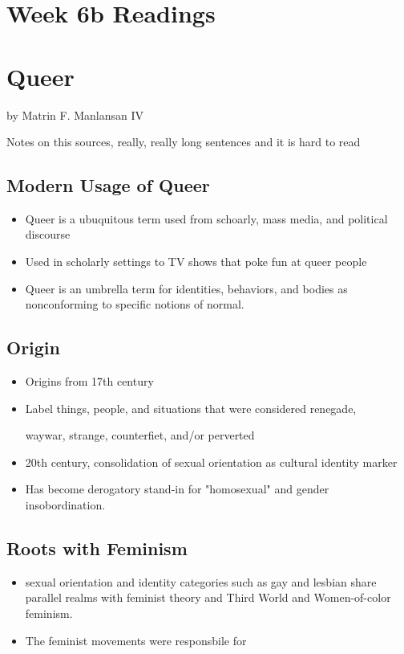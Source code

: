 \documentclass{article}
\begin{document}
  \section*{Week 6b Readings}

  \section{Queer}
  by Matrin F. Manlansan IV

  Notes on this sources, really, really long sentences and
  it is hard to read

  \subsection{Modern Usage of Queer}
  \begin{itemize}
    \item Queer is a ubuquitous term used from schoarly, mass media, and political discourse
    \item Used in scholarly settings to TV shows that poke fun at queer people
    \item Queer is an umbrella term for identities, behaviors, and bodies 
      as nonconforming to specific notions of normal.
  \end{itemize}

  \subsection{Origin}
  \begin{itemize}
    \item Origins from 17th century
    \item Label things, people, and situations that were considered renegade,

      waywar, strange, counterfiet, and/or perverted
    \item 20th century, consolidation of sexual orientation as
      cultural identity marker
    \item Has become derogatory stand-in for "homosexual" and gender insobordination.
  \end{itemize}

  \subsection{Roots with Feminism}
  \begin{itemize}
    \item sexual orientation and identity categories such as gay and lesbian share
      parallel realms with feminist theory
      and Third World and Women-of-color feminism.
    \item The feminist movements were responsbile for 
  \end{itemize}
\end{document}
